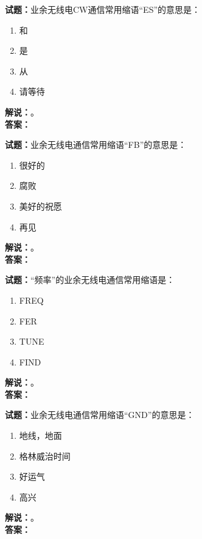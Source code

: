\documentclass{ctexbook}
\begin{document}
\bigskip




\noindent\textbf{试题：}业余无线电CW通信常用缩语“ES”的意思是：
\begin{enumerate}[leftmargin=3em]
\item 和
\item 是
\item 从
\item 请等待
\end{enumerate}
\noindent\textbf{解说：}\textbf{}。\\\noindent\textbf{答案：}

\bigskip




\noindent\textbf{试题：}业余无线电通信常用缩语“FB”的意思是：
\begin{enumerate}[leftmargin=3em]
\item 很好的
\item 腐败
\item 美好的祝愿
\item 再见
\end{enumerate}
\noindent\textbf{解说：}\textbf{}。\\\noindent\textbf{答案：}

\bigskip




\noindent\textbf{试题：}“频率”的业余无线电通信常用缩语是：
\begin{enumerate}[leftmargin=3em]
\item FREQ
\item FER
\item TUNE
\item FIND
\end{enumerate}
\noindent\textbf{解说：}\textbf{}。\\\noindent\textbf{答案：}

\bigskip




\noindent\textbf{试题：}业余无线电通信常用缩语“GND”的意思是：
\begin{enumerate}[leftmargin=3em]
\item 地线，地面
\item 格林威治时间
\item 好运气
\item 高兴
\end{enumerate}
\noindent\textbf{解说：}\textbf{}。\\\noindent\textbf{答案：}

\bigskip
\end{document}
